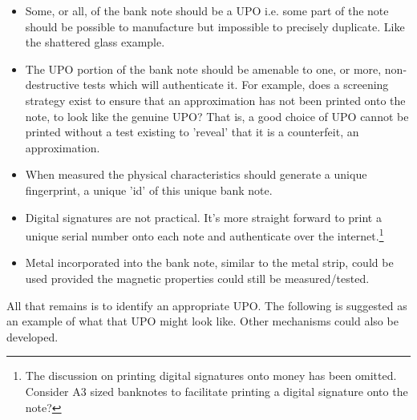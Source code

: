 \documentclass[smallextended]{svjour3}       	\smartqed  \usepackage{graphicx}
\begin{document}
\begin{itemize}
  \item Some, or all, of the bank note should be a UPO i.e. some part of the note should be possible to manufacture but impossible to precisely duplicate. Like the shattered glass example.
  \item The UPO portion of the bank note should be amenable to one, or more, non-destructive tests which will authenticate it. For example, does a screening strategy exist to ensure that an approximation has not been printed onto the note, to look like the genuine UPO? That is, a good choice of UPO cannot be printed without a test existing to 'reveal' that it is a counterfeit, an approximation.
  \item When measured the physical characteristics should generate a unique fingerprint, a unique 'id' of this unique bank note.
  \item Digital signatures are not practical. It's more straight forward to print a unique serial number onto each note and authenticate over the internet.\footnote{The discussion on printing digital signatures onto money has been omitted. Consider A3 sized banknotes to facilitate printing a digital signature onto the note?}
  \item Metal incorporated into the bank note, similar to the metal strip, could be used provided the magnetic properties could still be measured/tested.
\end{itemize}

\vspace{1mm}

\par All that remains is to identify an appropriate UPO. The following is suggested as an example of what that UPO might look like. Other mechanisms could also be developed.

\vspace{1mm}
\end{document}

